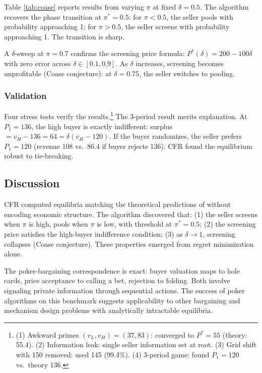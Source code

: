 Table \ref{tab:coase} reports results from varying $\pi$ at fixed $\delta = 0.5$. The algorithm recovers the phase transition at $\pi^* = 0.5$: for $\pi < 0.5$, the seller pools with probability approaching 1; for $\pi > 0.5$, the seller screens with probability approaching 1. The transition is sharp.

A $\delta$-sweep at $\pi = 0.7$ confirms the screening price formula: $P^*(\delta) = 200 - 100\delta$ with zero error across $\delta \in [0.1, 0.9]$. As $\delta$ increases, screening becomes unprofitable (Coase conjecture): at $\delta = 0.75$, the seller switches to pooling.

\subsubsection{Validation}

Four stress tests verify the results.\footnote{(1) Awkward primes $(v_L, v_H) = (37, 83)$: converged to $P^* = 55$ (theory: 55.4). (2) Information leak: single seller information set at root. (3) Grid shift with 150 removed: used 145 (99.4\%). (4) 3-period game: found $P_1 = 120$ vs.\ theory 136.} The 3-period result merits explanation. At $P_1 = 136$, the high buyer is exactly indifferent: surplus $= v_H - 136 = 64 = \delta(v_H - 120)$. If the buyer randomizes, the seller prefers $P_1 = 120$ (revenue 108 vs.\ 86.4 if buyer rejects 136). CFR found the equilibrium robust to tie-breaking.

\subsection{Discussion}

CFR computed equilibria matching the theoretical predictions of \citet{gul1986foundations} without encoding economic structure. The algorithm discovered that: (1) the seller screens when $\pi$ is high, pools when $\pi$ is low, with threshold at $\pi^* = 0.5$; (2) the screening price satisfies the high-buyer indifference condition; (3) as $\delta \to 1$, screening collapses (Coase conjecture). These properties emerged from regret minimization alone.

The poker-bargaining correspondence is exact: buyer valuation maps to hole cards, price acceptance to calling a bet, rejection to folding. Both involve signaling private information through sequential actions. The success of poker algorithms on this benchmark suggests applicability to other bargaining and mechanism design problems with analytically intractable equilibria.
